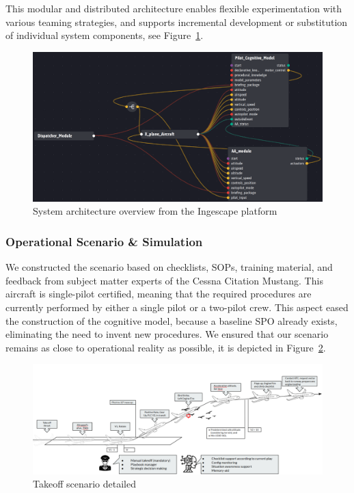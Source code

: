\documentclass[12pt,a4paper]{article} %
\begin{document}
	This modular and distributed architecture enables flexible experimentation with various teaming strategies, and supports incremental development or substitution of individual system components, see Figure~\ref{fig:ingescape_platform}.
	
	\begin{figure}[H] 
		\centering
		\includegraphics[width=1.0\textwidth]{./images/ingescape_platform.png}
		\caption{System architecture overview from the Ingescape platform}
		\label{fig:ingescape_platform}
	\end{figure}
	

	\subsubsection{Operational Scenario \& Simulation}
	We constructed the scenario based on checklists, SOPs, training material, and feedback from subject matter experts of the Cessna Citation Mustang. This aircraft is single-pilot certified, meaning that the required procedures are currently performed by either a single pilot or a two-pilot crew. This aspect eased the construction of the cognitive model, because a baseline SPO already exists, eliminating the need to invent new procedures. We ensured that our scenario remains as close to operational reality as possible, it is depicted in Figure~\ref{fig:scenario_detailed}.

	\begin{figure}[H]
		\centering
		\includegraphics[width=1.0\textwidth]{./images/scenario_detailed.png}
		\caption{Takeoff scenario detailed}
		\label{fig:scenario_detailed}
	\end{figure}
\end{document}
